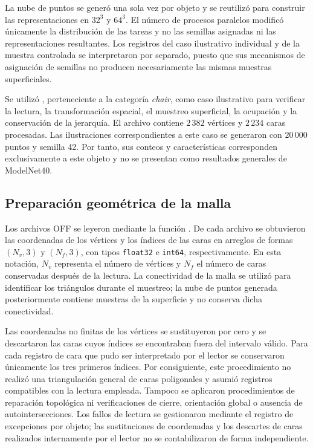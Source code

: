 La nube de puntos se generó una sola vez por objeto y se reutilizó para construir las representaciones en $32^3$ y $64^3$. El número de procesos paralelos modificó únicamente la distribución de las tareas y no las semillas asignadas ni las representaciones resultantes. Los registros del caso ilustrativo individual y de la muestra controlada se interpretaron por separado, puesto que sus mecanismos de asignación de semillas no producen necesariamente las mismas muestras superficiales.

Se utilizó \protect{}, perteneciente a la categoría \textit{chair}, como caso ilustrativo para verificar la lectura, la transformación espacial, el muestreo superficial, la ocupación y la conservación de la jerarquía. El archivo contiene $2\,382$ vértices y $2\,234$ caras procesadas. Las ilustraciones correspondientes a este caso se generaron con $20\,000$ puntos y semilla 42. Por tanto, sus conteos y características corresponden exclusivamente a este objeto y no se presentan como resultados generales de ModelNet40.

\subsection{Preparación geométrica de la malla}
\label{subsec:preparacion-malla}

Los archivos OFF se leyeron mediante la función \protect{}. De cada archivo se obtuvieron las coordenadas de los vértices y los índices de las caras en arreglos de formas $(N_v,3)$ y $(N_f,3)$, con tipos \texttt{float32} e \texttt{int64}, respectivamente. En esta notación, $N_v$ representa el número de vértices y $N_f$ el número de caras conservadas después de la lectura. La conectividad de la malla se utilizó para identificar los triángulos durante el muestreo; la nube de puntos generada posteriormente contiene muestras de la superficie y no conserva dicha conectividad.

Las coordenadas no finitas de los vértices se sustituyeron por cero y se descartaron las caras cuyos índices se encontraban fuera del intervalo válido. Para cada registro de cara que pudo ser interpretado por el lector se conservaron únicamente los tres primeros índices. Por consiguiente, este procedimiento no realizó una triangulación general de caras poligonales y asumió registros compatibles con la lectura empleada. Tampoco se aplicaron procedimientos de reparación topológica ni verificaciones de cierre, orientación global o ausencia de autointersecciones. Los fallos de lectura se gestionaron mediante el registro de excepciones por objeto; las sustituciones de coordenadas y los descartes de caras realizados internamente por el lector no se contabilizaron de forma independiente.

